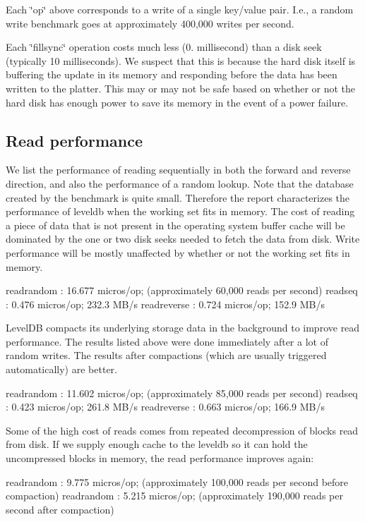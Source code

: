 Each \char`\"{}op\char`\"{} above corresponds to a write of a single key/value pair. I.\+e., a random write benchmark goes at approximately 400,000 writes per second.

Each \char`\"{}fillsync\char`\"{} operation costs much less (0. millisecond) than a disk seek (typically 10 milliseconds). We suspect that this is because the hard disk itself is buffering the update in its memory and responding before the data has been written to the platter. This may or may not be safe based on whether or not the hard disk has enough power to save its memory in the event of a power failure.

\subsection*{Read performance}

We list the performance of reading sequentially in both the forward and reverse direction, and also the performance of a random lookup. Note that the database created by the benchmark is quite small. Therefore the report characterizes the performance of leveldb when the working set fits in memory. The cost of reading a piece of data that is not present in the operating system buffer cache will be dominated by the one or two disk seeks needed to fetch the data from disk. Write performance will be mostly unaffected by whether or not the working set fits in memory. \begin{DoxyVerb}readrandom  : 16.677 micros/op;  (approximately 60,000 reads per second)
readseq     :  0.476 micros/op;  232.3 MB/s
readreverse :  0.724 micros/op;  152.9 MB/s
\end{DoxyVerb}


Level\+DB compacts its underlying storage data in the background to improve read performance. The results listed above were done immediately after a lot of random writes. The results after compactions (which are usually triggered automatically) are better. \begin{DoxyVerb}readrandom  : 11.602 micros/op;  (approximately 85,000 reads per second)
readseq     :  0.423 micros/op;  261.8 MB/s
readreverse :  0.663 micros/op;  166.9 MB/s
\end{DoxyVerb}


Some of the high cost of reads comes from repeated decompression of blocks read from disk. If we supply enough cache to the leveldb so it can hold the uncompressed blocks in memory, the read performance improves again\+: \begin{DoxyVerb}readrandom  : 9.775 micros/op;  (approximately 100,000 reads per second before compaction)
readrandom  : 5.215 micros/op;  (approximately 190,000 reads per second after compaction)
\end{DoxyVerb}


